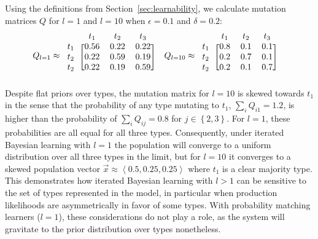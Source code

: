 \documentclass[a4paper, 11pt]{article}
\theoremstyle{Satz}
\newcommand{\tuple}[1]{\ensuremath{\left\langle #1 \right\rangle}}
\newcommand{\set}[1]{\left\{#1\right\}}
\begin{document}
Using the definitions from Section~\ref{sec:learnability}, we calculate mutation matrices $Q$ for
$l=1$ and $l=10$ when $\epsilon = 0.1$ and $\delta = 0.2$:
\begin{align*}
  Q_{l = 1} & \approx \begin{blockarray}{lccc}
    & t_1 & t_2 & t_3 \\
    \begin{block}{l[ccc]}
      t_1 & 0.56 & 0.22 & 0.22 \\
      t_2 & 0.22 & 0.59 & 0.19 \\
      t_2 & 0.22 & 0.19 & 0.59  \\
    \end{block}
  \end{blockarray} & 
  Q_{l = 10} & \approx \begin{blockarray}{lccc}
    & t_1 & t_2 & t_3 \\
    \begin{block}{l[ccc]}
      t_1 & 0.8 & 0.1 & 0.1 \\
      t_2 & 0.2 & 0.7 & 0.1 \\
      t_2 & 0.2 & 0.1 & 0.7  \\
    \end{block}
  \end{blockarray}
\end{align*}
Despite flat priors over types, the mutation matrix for $l=10$ is skewed towards $t_1$ in the
sense that the probability of any type mutating to $t_1$, $\sum_i Q_{i1} = 1.2$, is higher than
the probability of $\sum_i Q_{ij} = 0.8$ for $j \in \set{2,3}$. For $l=1$, these probabilities
are all equal for all three types. Consequently, under iterated Bayesian learning with $l=1$
the population will converge to a uniform distribution over all three types in the limit, but
for $l=10$ it converges to a skewed population vector $\vec{x} \approx \tuple{0.5, 0.25, 0.25}$
where $t_1$ is a clear majority type. This demonstrates how iterated Bayesian learning with
$l>1$ can be sensitive to the set of types represented in the model, in particular when
production likelihoods are asymmetrically in favor of some types. With probability matching
learners ($l = 1$), these considerations do not play a role, as the system will gravitate to
the prior distribution over types nonetheless.



\end{document}
